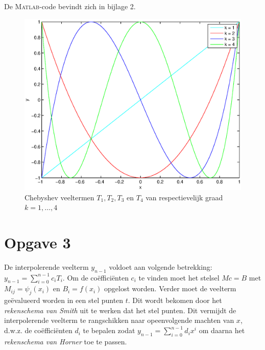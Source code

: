 \documentclass[a4paper]{article}
\newcommand{\opgave}[1]{\section*{Opgave #1}}
\begin{document}
De \textsc{Matlab}-code bevindt zich in bijlage 2.
\begin{figure}
        \centering
        \includegraphics[width=\textwidth]{Jona/chebyshev_polynomials.eps}
        \caption{Chebyshev veeltermen $T_{1},T_{2},T_{3}$ en $T_{4}$ van respectievelijk graad $k=1,\dots,4$}
        \label{fig:polynomials}
    \end{figure}
\opgave{3}
De interpolerende veelterm $y_{n-1}$ voldoet aan volgende betrekking: $y_{n-1} = \sum\limits_{i=0}^{n-1}c_{i}T_{i}$. Om de co\"effici\"enten $c_{i}$ te vinden moet het stelsel $Mc = B$ met $M_{ij} = \psi_{j}(x_{i})$ en $B_{i} = f(x_{i})$ opgelost worden. Verder moet de veelterm ge\"evalueerd worden in een stel punten $t$. Dit wordt bekomen door het \textit{rekenschema van Smith} uit te werken dat het stel punten. Dit vermijdt de interpolerende veelterm te rangschikken naar opeenvolgende machten van $x$, d.w.z. de co\"effici\"enten $d_{i}$ te bepalen zodat $y_{n-1} = \sum\limits_{i=0}^{n-1}d_{i}x^{i}$ om daarna het \textit{rekenschema van Horner} toe te passen.
\end{document}
